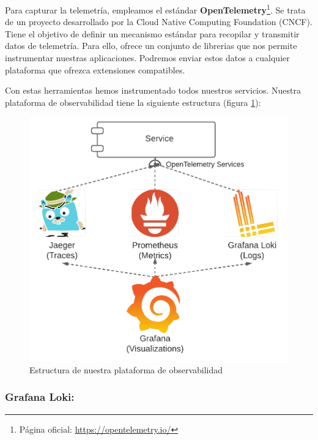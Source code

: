 Para capturar la telemetría, empleamos el estándar \textbf{OpenTelemetry}\footnote{Página oficial: \url{https://opentelemetry.io/}}. Se trata de un proyecto desarrollado por la Cloud Native Computing Foundation (CNCF). Tiene el objetivo de definir un mecanismo estándar para recopilar y transmitir datos de telemetría. Para ello, ofrece un conjunto de librerias que nos permite instrumentar nuestras aplicaciones. Podremos enviar estos datos a cualquier plataforma que ofrezca extensiones compatibles.

Con estas herramientas hemos instrumentado todos nuestros servicios. Nuestra plataforma de observabilidad tiene la siguiente estructura (figura \ref{fig:observability-telemetry-collection}):

\begin{figure}[h!]
  \centering
  \includegraphics[scale=0.28]{cap_despliegue/images/observability-telemetry-collection}
  \caption{Estructura de nuestra plataforma de observabilidad}
  \label{fig:observability-telemetry-collection}
\end{figure}

\subsubsection{Grafana Loki: }

